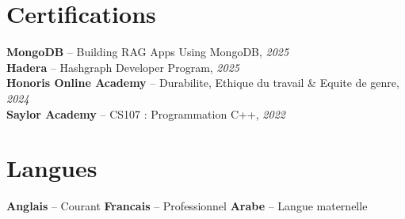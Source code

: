 \documentclass[10pt,a4paper]{article}
\begin{document}
\section*{Certifications}
{\small
\textbf{MongoDB} -- Building RAG Apps Using MongoDB, \textit{2025}\\[1pt]
\textbf{Hadera} -- Hashgraph Developer Program, \textit{2025}\\[1pt]
\textbf{Honoris Online Academy} -- Durabilite, Ethique du travail \& Equite de genre, \textit{2024}\\[1pt]
\textbf{Saylor Academy} -- CS107 : Programmation C++, \textit{2022}
}

\section*{Langues}
{\small
\textbf{Anglais} -- Courant \quad\textbar\quad \textbf{Francais} -- Professionnel \quad\textbar\quad \textbf{Arabe} -- Langue maternelle
}
\end{document}

